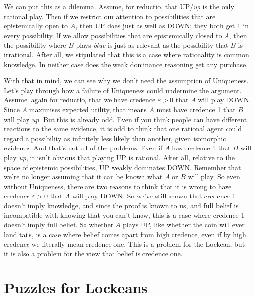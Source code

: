 \documentclass[11pt,]{book}
\begin{document}
We can put this as a dilemma. Assume, for reductio, that UP/\emph{up} is the only rational play. Then if we restrict our attention to possibilities that are epistemically open to \(A\), then UP does just as well as DOWN; they both get 1 in every possibility. If we allow possibilities that are epistemically closed to \(A\), then the possibility where \(B\) plays \emph{blue} is just as relevant as the possibility that \(B\) is irrational. After all, we stipulated that this is a case where rationality is common knowledge. In neither case does the weak dominance reasoning get any purchase.

With that in mind, we can see why we don't need the assumption of Uniqueness. Let's play through how a failure of Uniqueness could undermine the argument. Assume, again for reductio, that we have credence \(\varepsilon > 0\) that \(A\) will play DOWN. Since \(A\) maximises expected utility, that means \(A\) must have credence 1 that \(B\) will play \emph{up}. But this is already odd. Even if you think people can have different reactions to the same evidence, it is odd to think that one rational agent could regard a possibility as infinitely less likely than another, given isomorphic evidence. And that's not all of the problems. Even if \(A\) has credence 1 that \(B\) will play \emph{up}, it isn't obvious that playing UP is rational. After all, relative to the space of epistemic possibilities, UP weakly dominates DOWN. Remember that we're no longer assuming that it can be known what \(A\) or \(B\) will play. So even without Uniqueness, there are two reasons to think that it is wrong to have credence \(\varepsilon > 0\) that \(A\) will play DOWN. So we've still shown that credence 1 doesn't imply knowledge, and since the proof is known to us, and full belief is incompatible with knowing that you can't know, this is a case where credence 1 doesn't imply full belief. So whether \(A\) plays UP, like whether the coin will ever land tails, is a case where belief comes apart from high credence, even if by high credence we literally mean credence one. This is a problem for the Lockean, but it is also a problem for the view that belief is credence one.

\hypertarget{puzzles-for-lockeans}{%
\section{Puzzles for Lockeans}\label{puzzles-for-lockeans}}
\end{document}
